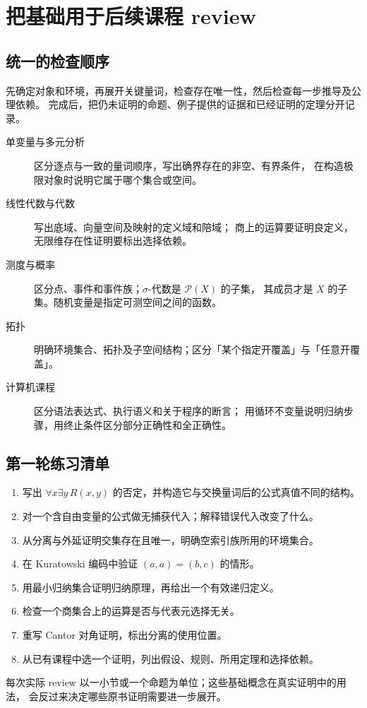 \chapter{把基础用于后续课程 review}

\section{统一的检查顺序}
先确定对象和环境，再展开关键量词，检查存在唯一性，然后检查每一步推导及公理依赖。
完成后，把仍未证明的命题、例子提供的证据和已经证明的定理分开记录。

\begin{description}
\item[单变量与多元分析] 区分逐点与一致的量词顺序，写出确界存在的非空、有界条件，
  在构造极限对象时说明它属于哪个集合或空间。
\item[线性代数与代数] 写出底域、向量空间及映射的定义域和陪域；
  商上的运算要证明良定义，无限维存在性证明要标出选择依赖。
\item[测度与概率] 区分点、事件和事件族；\(\sigma\)-代数是 \(\mathcal P(X)\) 的子集，
  其成员才是 \(X\) 的子集。随机变量是指定可测空间之间的函数。
\item[拓扑] 明确环境集合、拓扑及子空间结构；区分「某个指定开覆盖」与「任意开覆盖」。
\item[计算机课程] 区分语法表达式、执行语义和关于程序的断言；
  用循环不变量说明归纳步骤，用终止条件区分部分正确性和全正确性。
\end{description}

\section{第一轮练习清单}
\begin{enumerate}
\item 写出 \(\forall x\exists y\,R(x,y)\) 的否定，并构造它与交换量词后的公式真值不同的结构。
\item 对一个含自由变量的公式做无捕获代入；解释错误代入改变了什么。
\item 从分离与外延证明交集存在且唯一，明确空索引族所用的环境集合。
\item 在 Kuratowski 编码中验证 \((a,a)=(b,c)\) 的情形。
\item 用最小归纳集合证明归纳原理，再给出一个有效递归定义。
\item 检查一个商集合上的运算是否与代表元选择无关。
\item 重写 Cantor 对角证明，标出分离的使用位置。
\item 从已有课程中选一个证明，列出假设、规则、所用定理和选择依赖。
\end{enumerate}

每次实际 review 以一小节或一个命题为单位；这些基础概念在真实证明中的用法，
会反过来决定哪些原书证明需要进一步展开。
